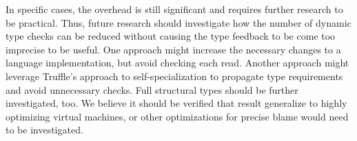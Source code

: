 
In specific cases, the overhead is still significant and requires further
research to be practical. Thus, future research should investigate how the
number of dynamic type checks can be reduced without causing
the type feedback to be come too imprecise to be useful.
One approach might increase the necessary changes to a language implementation,
but avoid checking each read.
Another approach might leverage Truffle's approach to self-specialization
to propagate type requirements and avoid unnecessary checks.
Full structural types should be further investigated, too.
We believe it should be verified that \citet{Richards2017} result generalize
to highly optimizing virtual machines,
or other optimizations for precise blame would need to be investigated.

